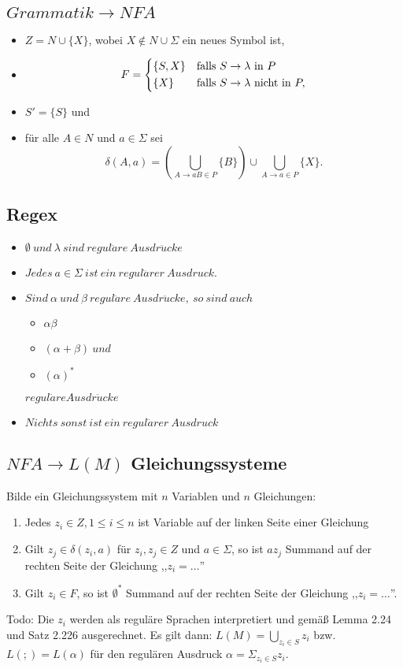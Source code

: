 \documentclass[9pt]{article}
\begin{document}
\subsection{$Grammatik \rightarrow NFA$}
\begin{itemize}
	\item $Z = N \cup \{X\}$, wobei $X \notin N \cup \Sigma$ ein neues Symbol ist,
	\item
	$$F =
	 \begin{dcases}
		\{S, X\} &\text{falls }S \rightarrow \lambda\text{ in }P\\
		\{X\}&\text{falls }S \rightarrow \lambda\text{ nicht in }P,
	\end{dcases} $$
	\item $S' = \{S\}$ und
	\item für alle $A \in N$ und $a \in \Sigma$ sei
	$$\delta(A, a) = \left(\bigcup_{A\rightarrow aB \in P} \{B\} \right) \cup \bigcup_{A\rightarrow a \in P} \{X\}.$$
\end{itemize}
\subsection{Regex}
\begin{itemize}
	\item $\emptyset\ und\ \lambda\ sind\ regul\ddot{a}re\ Ausdr\ddot{u}cke$
	\item $Jedes\ a \in \Sigma\ ist\ ein\ regul\ddot{a}rer\ Ausdruck.$
	\item $Sind\ \alpha\ und\ \beta\ regul\ddot{a}re\ Ausdr\ddot{u}cke,\ so\ sind\ auch$
	  	\begin{itemize}
			\item $\alpha\beta$
			\item $(\alpha + \beta)\ und$
			\item $(\alpha)^*$
		\end{itemize}
		$regul\ddot{a}re Ausdr\ddot{u}cke$
	\item $Nichts\ sonst\ ist\ ein\ regul\ddot{a}rer\ Ausdruck$
\end{itemize}
\subsection{$NFA \rightarrow L(M)$ Gleichungssysteme}
Bilde ein Gleichungssystem mit $n$ Variablen und $n$ Gleichungen:
\begin{enumerate}
	\item Jedes $z_i \in Z, 1 \leq i \leq n$ ist Variable auf der linken Seite einer Gleichung
	\item Gilt $z_j \in \delta(z_i, a)$ für $z_i, z_j \in Z$ und $a \in \Sigma$, so ist $az_j$ Summand auf der rechten Seite der Gleichung ,,$z_i = \dots$''
	\item Gilt $z_i \in F$, so ist $\emptyset^*$ Summand auf der rechten Seite der Gleichung ,,$z_i = \dots$''.
\end{enumerate}
Todo: Die $z_i$ werden als reguläre Sprachen interpretiert und gemäß Lemma 2.24 und Satz 2.226 ausgerechnet.
Es gilt dann: $L(M) = \bigcup_{z_i \in S}z_i$ bzw. $L(;) = L(\alpha)$ für den regulären Ausdruck $\alpha = \Sigma_{z_i \in S}z_i$.
\end{document}
